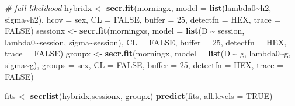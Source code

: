 \documentclass[
]{book}
\newenvironment{Shaded}{\begin{snugshade}}{\end{snugshade}}
\newcommand{\AttributeTok}[1]{\textcolor[rgb]{0.13,0.29,0.53}{#1}}
\newcommand{\CommentTok}[1]{\textcolor[rgb]{0.56,0.35,0.01}{\textit{#1}}}
\newcommand{\ConstantTok}[1]{\textcolor[rgb]{0.56,0.35,0.01}{#1}}
\newcommand{\DecValTok}[1]{\textcolor[rgb]{0.00,0.00,0.81}{#1}}
\newcommand{\FunctionTok}[1]{\textcolor[rgb]{0.13,0.29,0.53}{\textbf{#1}}}
\newcommand{\NormalTok}[1]{#1}
\newcommand{\OtherTok}[1]{\textcolor[rgb]{0.56,0.35,0.01}{#1}}
\newcommand{\SpecialCharTok}[1]{\textcolor[rgb]{0.81,0.36,0.00}{\textbf{#1}}}
\newcommand{\StringTok}[1]{\textcolor[rgb]{0.31,0.60,0.02}{#1}}
\begin{document}
\begin{Shaded}
\begin{Highlighting}[]
\CommentTok{\# full likelihood}
\NormalTok{hybridx  }\OtherTok{\textless{}{-}} \FunctionTok{secr.fit}\NormalTok{(morningx, }\AttributeTok{model =} \FunctionTok{list}\NormalTok{(lambda0}\SpecialCharTok{\textasciitilde{}}\NormalTok{h2, sigma}\SpecialCharTok{\textasciitilde{}}\NormalTok{h2), }\AttributeTok{hcov =} \StringTok{\textquotesingle{}sex\textquotesingle{}}\NormalTok{, }
             \AttributeTok{CL =} \ConstantTok{FALSE}\NormalTok{, }\AttributeTok{buffer =} \DecValTok{25}\NormalTok{, }\AttributeTok{detectfn =} \StringTok{\textquotesingle{}HEX\textquotesingle{}}\NormalTok{, }\AttributeTok{trace =} \ConstantTok{FALSE}\NormalTok{)}
\NormalTok{sessionx }\OtherTok{\textless{}{-}} \FunctionTok{secr.fit}\NormalTok{(morningxs, }\AttributeTok{model =} \FunctionTok{list}\NormalTok{(D }\SpecialCharTok{\textasciitilde{}}\NormalTok{ session, lambda0}\SpecialCharTok{\textasciitilde{}}\NormalTok{session, sigma}\SpecialCharTok{\textasciitilde{}}\NormalTok{session), }
             \AttributeTok{CL =} \ConstantTok{FALSE}\NormalTok{, }\AttributeTok{buffer =} \DecValTok{25}\NormalTok{, }\AttributeTok{detectfn =} \StringTok{\textquotesingle{}HEX\textquotesingle{}}\NormalTok{, }\AttributeTok{trace =} \ConstantTok{FALSE}\NormalTok{)}
\NormalTok{groupx   }\OtherTok{\textless{}{-}} \FunctionTok{secr.fit}\NormalTok{(morningx, }\AttributeTok{model =} \FunctionTok{list}\NormalTok{(D }\SpecialCharTok{\textasciitilde{}}\NormalTok{ g, lambda0}\SpecialCharTok{\textasciitilde{}}\NormalTok{g, sigma}\SpecialCharTok{\textasciitilde{}}\NormalTok{g), }\AttributeTok{groups =} \StringTok{\textquotesingle{}sex\textquotesingle{}}\NormalTok{, }
             \AttributeTok{CL =} \ConstantTok{FALSE}\NormalTok{, }\AttributeTok{buffer =} \DecValTok{25}\NormalTok{, }\AttributeTok{detectfn =} \StringTok{\textquotesingle{}HEX\textquotesingle{}}\NormalTok{, }\AttributeTok{trace =} \ConstantTok{FALSE}\NormalTok{)}
\end{Highlighting}
\end{Shaded}

\begin{Shaded}
\begin{Highlighting}[]
\NormalTok{fits }\OtherTok{\textless{}{-}} \FunctionTok{secrlist}\NormalTok{(hybridx,sessionx, groupx)}
\FunctionTok{predict}\NormalTok{(fits, }\AttributeTok{all.levels =} \ConstantTok{TRUE}\NormalTok{)}
\end{Highlighting}
\end{Shaded}
\end{document}

